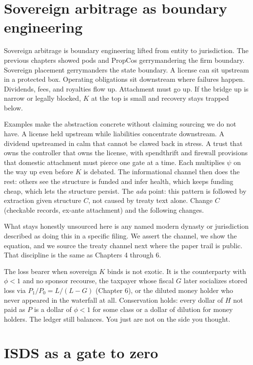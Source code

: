 \section{Sovereign arbitrage as boundary engineering}

Sovereign arbitrage is boundary engineering lifted from entity to jurisdiction. The previous chapters showed pods and PropCos gerrymandering the firm boundary. Sovereign placement gerrymanders the state boundary. A license can sit upstream in a protected box. Operating obligations sit downstream where failures happen. Dividends, fees, and royalties flow up. Attachment must go up. If the bridge up is narrow or legally blocked, $K$ at the top is small and recovery stays trapped below.

Examples make the abstraction concrete without claiming sourcing we do not have. A license held upstream while liabilities concentrate downstream. A dividend upstreamed in calm that cannot be clawed back in stress. A trust that owns the controller that owns the license, with spendthrift and firewall provisions that domestic attachment must pierce one gate at a time. Each multiplies $\psi$ on the way up even before $K$ is debated. The informational channel then does the rest: others see the structure is funded and infer health, which keeps funding cheap, which lets the structure persist. The \textit{ada} point: this pattern is followed by extraction given structure $C$, not caused by treaty text alone. Change $C$ (checkable records, ex-ante attachment) and the following changes.

What stays honestly unsourced here is any named modern dynasty or jurisdiction described as doing this in a specific filing. We assert the channel, we show the equation, and we source the treaty channel next where the paper trail is public. That discipline is the same as Chapters 4 through 6.

The loss bearer when sovereign $K$ binds is not exotic. It is the counterparty with $\phi < 1$ and no sponsor recourse, the taxpayer whose fiscal $G$ later socializes stored loss via $P_1/P_0 = L/(L-G)$ (Chapter 6), or the diluted money holder who never appeared in the waterfall at all. Conservation holds: every dollar of $H$ not paid as $P$ is a dollar of $\phi < 1$ for some class or a dollar of dilution for money holders. The ledger still balances. You just are not on the side you thought.

\section{ISDS as a gate to zero}

